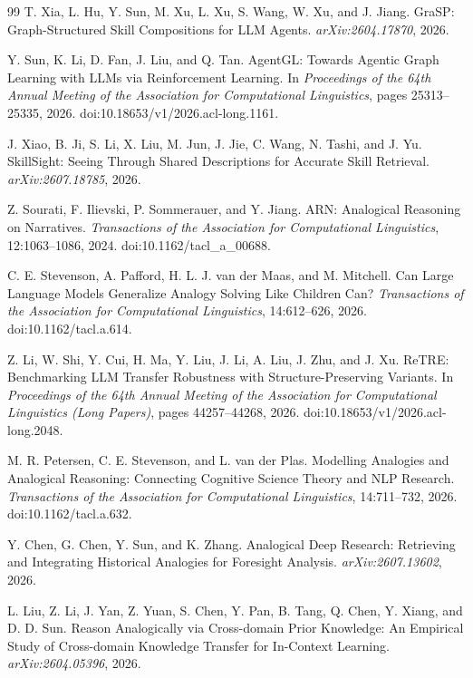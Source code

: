 \begin{thebibliography}{99}
T. Xia, L. Hu, Y. Sun, M. Xu, L. Xu, S. Wang, W. Xu, and J. Jiang. GraSP: Graph-Structured Skill Compositions for LLM Agents. \emph{arXiv:2604.17870}, 2026.

Y. Sun, K. Li, D. Fan, J. Liu, and Q. Tan. AgentGL: Towards Agentic Graph Learning with LLMs via Reinforcement Learning. In \emph{Proceedings of the 64th Annual Meeting of the Association for Computational Linguistics}, pages 25313--25335, 2026. doi:10.18653/v1/2026.acl-long.1161.

J. Xiao, B. Ji, S. Li, X. Liu, M. Jun, J. Jie, C. Wang, N. Tashi, and J. Yu. SkillSight: Seeing Through Shared Descriptions for Accurate Skill Retrieval. \emph{arXiv:2607.18785}, 2026.

Z. Sourati, F. Ilievski, P. Sommerauer, and Y. Jiang. ARN: Analogical Reasoning on Narratives. \emph{Transactions of the Association for Computational Linguistics}, 12:1063--1086, 2024. doi:10.1162/tacl\_a\_00688.

C. E. Stevenson, A. Pafford, H. L. J. van der Maas, and M. Mitchell. Can Large Language Models Generalize Analogy Solving Like Children Can? \emph{Transactions of the Association for Computational Linguistics}, 14:612--626, 2026. doi:10.1162/tacl.a.614.

Z. Li, W. Shi, Y. Cui, H. Ma, Y. Liu, J. Li, A. Liu, J. Zhu, and J. Xu. ReTRE: Benchmarking LLM Transfer Robustness with Structure-Preserving Variants. In \emph{Proceedings of the 64th Annual Meeting of the Association for Computational Linguistics (Long Papers)}, pages 44257--44268, 2026. doi:10.18653/v1/2026.acl-long.2048.

M. R. Petersen, C. E. Stevenson, and L. van der Plas. Modelling Analogies and Analogical Reasoning: Connecting Cognitive Science Theory and NLP Research. \emph{Transactions of the Association for Computational Linguistics}, 14:711--732, 2026. doi:10.1162/tacl.a.632.

Y. Chen, G. Chen, Y. Sun, and K. Zhang. Analogical Deep Research: Retrieving and Integrating Historical Analogies for Foresight Analysis. \emph{arXiv:2607.13602}, 2026.

L. Liu, Z. Li, J. Yan, Z. Yuan, S. Chen, Y. Pan, B. Tang, Q. Chen, Y. Xiang, and D. D. Sun. Reason Analogically via Cross-domain Prior Knowledge: An Empirical Study of Cross-domain Knowledge Transfer for In-Context Learning. \emph{arXiv:2604.05396}, 2026.


\end{thebibliography}

